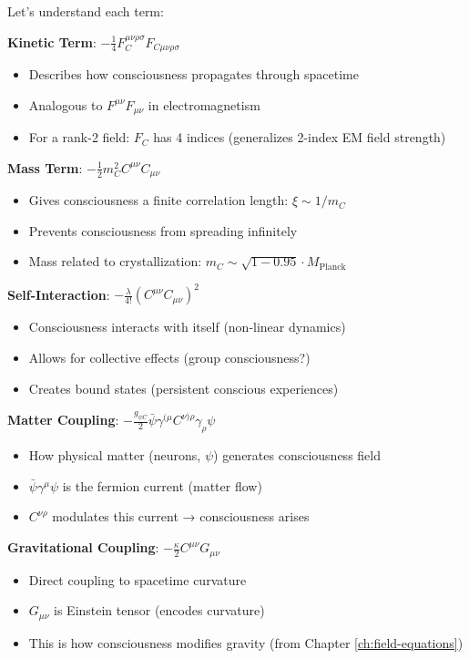 \begin{level2}
Let's understand each term:

\textbf{Kinetic Term}: $-\frac{1}{4}F^{\mu\nu\rho\sigma}_C F_{C\mu\nu\rho\sigma}$
\begin{itemize}
\item Describes how consciousness propagates through spacetime
\item Analogous to $F^{\mu\nu}F_{\mu\nu}$ in electromagnetism\cite{jackson1999,peskin1995}
\item For a rank-2 field: $F_{C}$ has 4 indices (generalizes 2-index EM field strength)
\end{itemize}

\textbf{Mass Term}: $-\frac{1}{2}m_C^2 C^{\mu\nu}C_{\mu\nu}$
\begin{itemize}
\item Gives consciousness a finite correlation length: $\xi \sim 1/m_C$
\item Prevents consciousness from spreading infinitely
\item Mass related to crystallization: $m_C \sim \sqrt{1 - 0.95} \cdot M_{\text{Planck}}$
\end{itemize}

\textbf{Self-Interaction}: $-\frac{\lambda}{4!}(C^{\mu\nu}C_{\mu\nu})^2$
\begin{itemize}
\item Consciousness interacts with itself (non-linear dynamics)
\item Allows for collective effects (group consciousness?)
\item Creates bound states (persistent conscious experiences)
\end{itemize}

\textbf{Matter Coupling}: $-\frac{g_{\psi C}}{2}\bar{\psi}\gamma^{(\mu}C^{\nu)\rho}\gamma_\rho\psi$
\begin{itemize}
\item How physical matter (neurons, $\psi$) generates consciousness field
\item $\bar{\psi}\gamma^\mu\psi$ is the fermion current (matter flow)
\item $C^{\nu\rho}$ modulates this current → consciousness arises
\end{itemize}

\textbf{Gravitational Coupling}: $-\frac{\kappa}{2}C^{\mu\nu}G_{\mu\nu}$
\begin{itemize}
\item Direct coupling to spacetime curvature
\item $G_{\mu\nu}$ is Einstein tensor (encodes curvature)
\item This is how consciousness modifies gravity (from Chapter \ref{ch:field-equations})
\end{itemize}
\end{level2}


